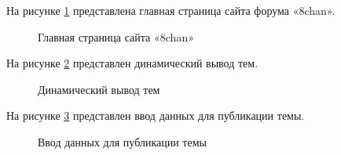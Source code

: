 На рисунке \ref{main:image} представлена главная страница сайта форума «8chan».

\begin{figure}[H] %
\caption{Главная страница сайта «8chan»}
\label{main:image}
\end{figure}

На рисунке \ref{menu:image} представлен динамический вывод тем.

\begin{figure}[H]
\caption{Динамический вывод тем}
\label{menu:image}
\end{figure}

\newpage
На рисунке \ref{enter:image} представлен ввод данных для публикации темы.

\begin{figure}[H]
\caption{Ввод данных для публикации темы}
\label{enter:image}
\end{figure}
